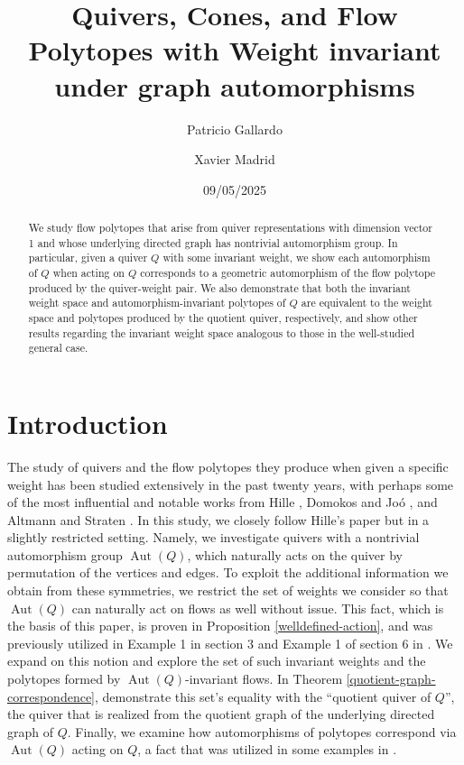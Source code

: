 \documentclass[11pt]{amsart}
\title{
Quivers, Cones, and Flow Polytopes with Weight invariant under graph automorphisms
}
\author{Patricio Gallardo}
\author{Xavier Madrid}
\date{09/05/2025}
\theoremstyle{plain}
\theoremstyle{definition}
\DeclareMathOperator{\aut}{Aut}
\begin{document}
\begin{abstract}
    We study flow polytopes that arise from quiver representations with dimension vector 1 and whose underlying directed graph has nontrivial automorphism group. In particular, given a quiver $Q$ with some invariant weight, we show each automorphism of $Q$ when acting on $Q$ corresponds to a geometric automorphism of the flow polytope produced by the quiver-weight pair. We also demonstrate that both the invariant weight space and automorphism-invariant polytopes of $Q$ are equivalent to the weight space and polytopes produced by the quotient quiver, respectively, and show other results regarding the invariant weight space analogous to those in the well-studied general case.

\end{abstract}
\maketitle

\section{Introduction}

\noindent The study of quivers and the flow polytopes they produce when given a specific weight has been studied extensively in the past twenty years, with perhaps some of the most influential and notable works from Hille \cite{hille2003quivers}, Domokos and Joó \cite{domokos2016equations}, and Altmann and Straten \cite{Altmann2009}. In this study, we closely follow Hille's paper but in a slightly restricted setting. Namely, we investigate quivers with a nontrivial automorphism group $\aut(Q)$, which naturally acts on the quiver by permutation of the vertices and edges. To exploit the additional information we obtain from these symmetries, we restrict the set of weights we consider so that $\aut(Q)$ can naturally act on flows as well without issue. This fact, which is the basis of this paper, is proven in Proposition \ref{welldefined-action}, and was previously utilized in Example 1 in section 3 and Example 1 of section 6 in \cite{hille2003quivers}.  We expand on this notion and explore the set of such invariant weights and the polytopes formed by $\aut(Q)$-invariant flows. In Theorem \ref{quotient-graph-correspondence}, demonstrate this set's equality with the ``quotient quiver of $Q$'', the quiver that is realized from the quotient graph of the underlying directed graph of $Q$. Finally, we examine how automorphisms of polytopes correspond via $\aut(Q)$ acting on $Q$, a fact that was utilized in some examples in \cite{hille2003quivers}.
\end{document}

